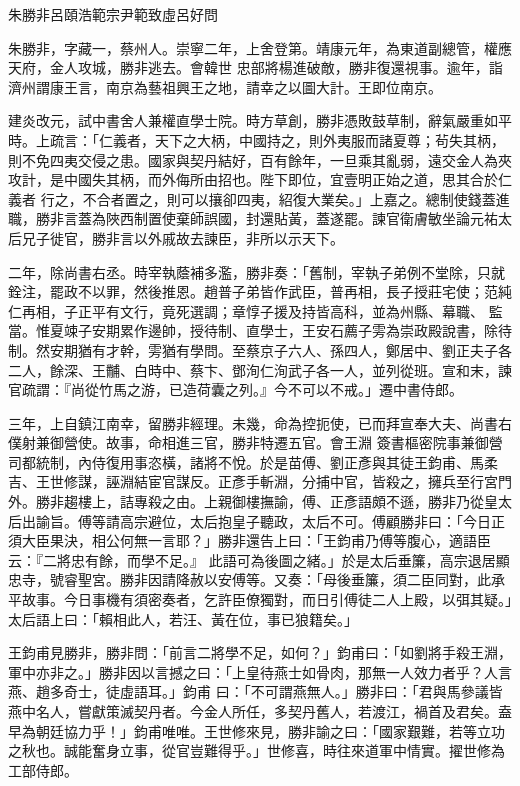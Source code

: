 
\begin{pinyinscope}

 朱勝非呂頤浩範宗尹範致虛呂好問



 朱勝非，字藏一，蔡州人。崇寧二年，上舍登第。靖康元年，為東道副總管，權應天府，金人攻城，勝非逃去。會韓世
 忠部將楊進破敵，勝非復還視事。逾年，詣濟州謂康王言，南京為藝祖興王之地，請幸之以圖大計。王即位南京。



 建炎改元，試中書舍人兼權直學士院。時方草創，勝非憑敗鼓草制，辭氣嚴重如平時。上疏言：「仁義者，天下之大柄，中國持之，則外夷服而諸夏尊；茍失其柄，則不免四夷交侵之患。國家與契丹結好，百有餘年，一旦乘其亂弱，遠交金人為夾攻計，是中國失其柄，而外侮所由招也。陛下即位，宜壹明正始之道，思其合於仁義者
 行之，不合者置之，則可以攘卻四夷，紹復大業矣。」上嘉之。總制使錢蓋進職，勝非言蓋為陜西制置使棄師誤國，封還貼黃，蓋遂罷。諫官衛膚敏坐論元祐太后兄子徙官，勝非言以外戚故去諫臣，非所以示天下。



 二年，除尚書右丞。時宰執蔭補多濫，勝非奏：「舊制，宰執子弟例不堂除，只就銓注，罷政不以罪，然後推恩。趙普子弟皆作武臣，普再相，長子授莊宅使；范純仁再相，子正平有文行，竟死選調；章惇子援及持皆高科，並為州縣、幕職、
 監當。惟夏竦子安期累作邊帥，授待制、直學士，王安石薦子雱為崇政殿說書，除待制。然安期猶有才幹，雱猶有學問。至蔡京子六人、孫四人，鄭居中、劉正夫子各二人，餘深、王黼、白時中、蔡卞、鄧洵仁洵武子各一人，並列從班。宣和末，諫官疏謂：『尚從竹馬之游，已造荷囊之列。』今不可以不戒。」遷中書侍郎。



 三年，上自鎮江南幸，留勝非經理。未幾，命為控扼使，已而拜宣奉大夫、尚書右僕射兼御營使。故事，命相進三官，勝非特遷五官。會王淵
 簽書樞密院事兼御營司都統制，內侍復用事恣橫，諸將不悅。於是苗傅、劉正彥與其徒王鈞甫、馬柔吉、王世修謀，誣淵結宦官謀反。正彥手斬淵，分捕中官，皆殺之，擁兵至行宮門外。勝非趨樓上，詰專殺之由。上親御樓撫諭，傅、正彥語頗不遜，勝非乃從皇太后出諭旨。傅等請高宗避位，太后抱皇子聽政，太后不可。傅顧勝非曰：「今日正須大臣果決，相公何無一言耶？」勝非還告上曰：「王鈞甫乃傅等腹心，適語臣云：『二將忠有餘，而學不足。』
 此語可為後圖之緒。」於是太后垂簾，高宗退居顯忠寺，號睿聖宮。勝非因請降赦以安傅等。又奏：「母後垂簾，須二臣同對，此承平故事。今日事機有須密奏者，乞許臣僚獨對，而日引傅徒二人上殿，以弭其疑。」太后語上曰：「賴相此人，若汪、黃在位，事已狼籍矣。」



 王鈞甫見勝非，勝非問：「前言二將學不足，如何？」鈞甫曰：「如劉將手殺王淵，軍中亦非之。」勝非因以言撼之曰：「上皇待燕士如骨肉，那無一人效力者乎？人言燕、趙多奇士，徒虛語耳。」鈞甫
 曰：「不可謂燕無人。」勝非曰：「君與馬參議皆燕中名人，嘗獻策滅契丹者。今金人所任，多契丹舊人，若渡江，禍首及君矣。盍早為朝廷協力乎！」鈞甫唯唯。王世修來見，勝非諭之曰：「國家艱難，若等立功之秋也。誠能奮身立事，從官豈難得乎。」世修喜，時往來道軍中情實。擢世修為工部侍郎。




\end{pinyinscope}
